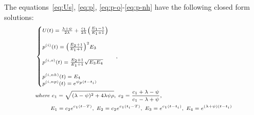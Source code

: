 \documentclass[a4paper,10pt]{article}
\begin{document}
The equations~\ref{eq:Us}, \ref{eq:p}, \ref{eq:p-o}-\ref{eq:p-nh} have the following closed form solutions:
\begin{equation}
\scriptsize
\begin{split}
&\begin{cases}
U(t) = \frac{\lambda + \psi}{2\lambda} +  \frac{c_1}{2\lambda}\Big(\frac{E_1 - 1}{E_1 + 1}\Big)\\
\\
p^{(i)}(t) = \Big(\frac{E_2 + 1}{E_1 + 1}\Big)^2E_3 \\
\\
p^{(i,o)}(t) =  \frac{E_2 + 1}{E_1 + 1}\sqrt{E_3E_4} \\
\\
p^{(i,nh)}(t) =  E_4
\\
p^{(i,np)}(t) =  e^{\psi_p (t -t_i)}
\end{cases},\\
& \textit{where } c_1 = \sqrt{(\lambda - \psi)^2 + 4 \lambda\psi\rho},\; c_2 = \frac{c_1 + \lambda - \psi}{c_1 - \lambda + \psi},\\
& ~~~~~~~~E_1 = c_2 e^{c_1 (t -T)},\; E_2 = c_2 e^{c_1 (t_i -T)},\; E_3 = e^{c_1 (t -t_i)}, \; E_4 =  e^{(\lambda + \psi) (t -t_i)}\\
\end{split}\label{eq:ps}
\end{equation}



%
%
\end{document}
